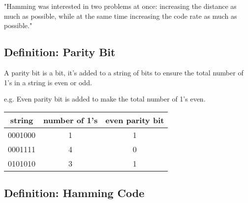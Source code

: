 \documentclass[12pt]{article}
\begin{document}
\begin{center}
  "Hamming was interested in two problems at once: increasing the distance as much as possible, while at the same time increasing the code rate as much as possible."
\end{center}

\subsection{Definition: Parity Bit}
A parity bit is a bit, it's added to a string of bits to ensure the total number of 1's in a string is even or odd. 

e.g. Even parity bit is added to make the total number of 1's even. 

\begin{center}
  \begin{tabular}{ c | c | c }
   string & number of 1's & even parity bit \\ 
   \hline
   0001000 & 1 & 1 \\  
   0001111 & 4 & 0 \\
   0101010 & 3 & 1     
  \end{tabular}
\end{center}

\subsection{Definition: Hamming Code}

    
\end{document}
